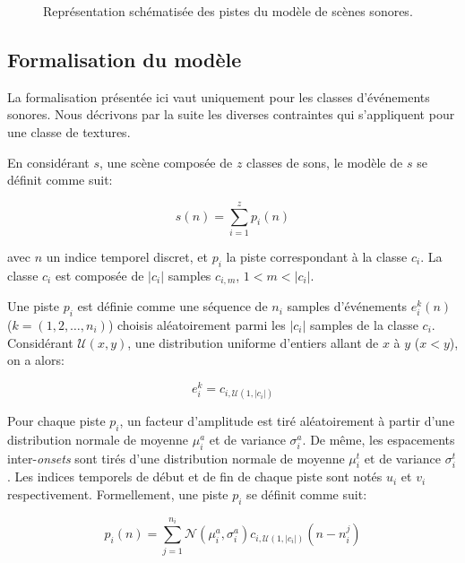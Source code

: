 \begin{figure}[t]
        \graphicspath{{gfx/ch_4/}}
        \myfloatalign
        \def\svgwidth{\linewidth}
        
       \caption{Représentation schématisée des pistes du modèle de scènes sonores.}\label{fig:modelSequence}
\end{figure}


\subsection{Formalisation du modèle}
 \label{sec:ch4_modelForm}
 
La formalisation présentée ici vaut uniquement pour les classes d'événements sonores. Nous décrivons par la suite les diverses contraintes qui s'appliquent pour une classe de textures.
 
En considérant $s$, une scène composée de $z$ classes de sons, le modèle de $s$ se définit comme suit:
 
 \begin{equation}
 s(n)=\sum_{i=1}^{z}p_i(n)
 \end{equation}

avec $n$ un indice temporel discret, et $p_i$ la piste correspondant à la classe $c_i$. La classe $c_i$ est composée de $\vert c_i\vert$ samples $c_{i,m}$, $1<m<\vert c_i\vert$. 

Une piste $p_i$ est définie comme une séquence de $n_i$ samples d'événements $e^k_i(n)$ ($k=(1,2,\ldots,n_i)$) choisis aléatoirement parmi les $\vert c_i\vert$ samples de la classe $c_i$. Considérant $\mathcal{U}(x,y)$, une distribution uniforme d'entiers allant de $x$ à $y$ ($x<y$), on a alors:

 \begin{equation}
 e^k_i=c_{i,\mathcal{U}(1,\vert c_i \vert)}
 \end{equation}

 Pour chaque piste $p_i$, un facteur d'amplitude est tiré aléatoirement à partir d'une distribution normale de moyenne $\mu^a_i$ et de variance $\sigma^a_i$. De même, les espacements inter-\emph{onsets} sont tirés d'une distribution normale de moyenne $\mu^t_i$ et de variance $\sigma^t_i$. Les indices temporels de début et de fin de chaque piste sont notés $u_i$ et $v_i$ respectivement. Formellement, une piste $p_i$ se définit comme suit:
 
\begin{equation}
\label{eq:ch4_eq1}
p_{i}(n)= \sum_{j=1}^{n_i} \mathcal{N}(\mu^a_{i},\sigma^a_{i})c_{i, \mathcal{U} (1, |c_i|)}(n-n^j_i)
\end{equation}


